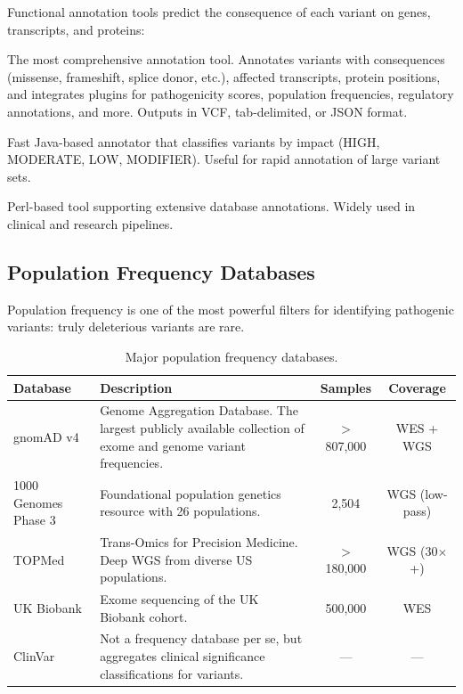 Functional annotation tools predict the consequence of each variant on genes, transcripts, and proteins:

\begin{description}[style=nextline]
  \item[VEP (Ensembl Variant Effect Predictor)] The most comprehensive annotation tool. Annotates variants with consequences (missense, frameshift, splice donor, etc.), affected transcripts, protein positions, and integrates plugins for pathogenicity scores, population frequencies, regulatory annotations, and more. Outputs in VCF, tab-delimited, or JSON format.
  \item[SnpEff] Fast Java-based annotator that classifies variants by impact (HIGH, MODERATE, LOW, MODIFIER). Useful for rapid annotation of large variant sets.
  \item[ANNOVAR] Perl-based tool supporting extensive database annotations. Widely used in clinical and research pipelines.
\end{description}

\subsection{Population Frequency Databases}

Population frequency is one of the most powerful filters for identifying pathogenic variants: truly deleterious variants are rare.

\begin{table}[htbp]
\centering
\caption{Major population frequency databases.}
\label{tab:pop_freq}
\begin{tabularx}{\textwidth}{@{}lXcc@{}}
\toprule
\textbf{Database} & \textbf{Description} & \textbf{Samples} & \textbf{Coverage} \\
\midrule
gnomAD v4 & Genome Aggregation Database. The largest publicly available collection of exome and genome variant frequencies. & $>$807,000 & WES + WGS \\
1000 Genomes Phase 3 & Foundational population genetics resource with 26 populations. & 2,504 & WGS (low-pass) \\
TOPMed & Trans-Omics for Precision Medicine. Deep WGS from diverse US populations. & $>$180,000 & WGS (30$\times$+) \\
UK Biobank & Exome sequencing of the UK Biobank cohort. & 500,000 & WES \\
ClinVar & Not a frequency database per se, but aggregates clinical significance classifications for variants. & --- & --- \\
\bottomrule
\end{tabularx}
\end{table}

